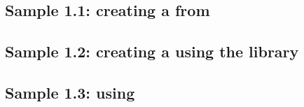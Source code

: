 
\subsection{Sample 1.1: creating a \gdcase{} from \gdsteps{}}
\label{samplesteststeps}


\subsection{Sample 1.2: creating a \gdcase{} using the library}
\label{sampleslibrary}


\subsection{Sample 1.3: using \gdehandlers{}}



